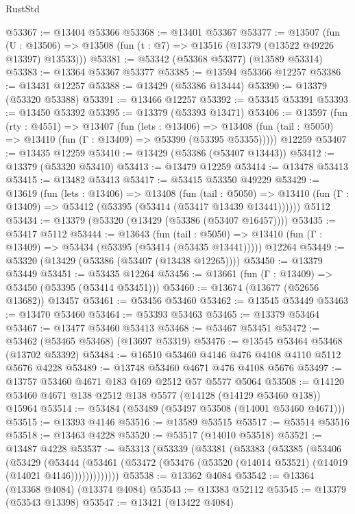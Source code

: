 \begin{lexlean}{RustStd}
\begin{coremodule}
@53367 := @13404 @53366
@53368 := @13401 @53367
@53377 := @13507
    (fun (U : @13506) => @13508 (fun (t : @7) => @13516 (@13379 (@13522 @49226 @13397) @13533)))
@53381 := @53342 (@53368 @53377) (@13589 @53314)
@53383 := @13364 @53367 @53377
@53385 := @13594 @53366 @12257
@53386 := @13431 @12257
@53388 := @13429 (@53386 @13444)
@53390 := @13379 (@53320 @53388)
@53391 := @13466 @12257
@53392 := @53345 @53391
@53393 := @13450 @53392
@53395 := @13379 (@53393 @13471)
@53406 := @13597
    (fun (rty : @4551) =>
    @13407
      (fun (lets : @13406) =>
      @13408 (fun (tail : @5050) => @13410 (fun (Γ : @13409) => @53390 (@53395 @53355)))))
    @12259
@53407 := @13435 @12259
@53410 := @13429 (@53386 (@53407 @13443))
@53412 := @13379 (@53320 @53410)
@53413 := @13479 @12259
@53414 := @13478 @53413
@53415 := @13482 @53413
@53417 := @53415 @53350 @49229
@53429 := @13619
    (fun (lets : @13406) =>
    @13408
      (fun (tail : @5050) =>
      @13410 (fun (Γ : @13409) => @53412 (@53395 (@53414 (@53417 @13439 @13441))))))
    @5112
@53434 := @13379 (@53320 (@13429 (@53386 (@53407 @16457))))
@53435 := @53417 @5112
@53444 := @13643
    (fun (tail : @5050) => @13410 (fun (Γ : @13409) => @53434 (@53395 (@53414 (@53435 @13441)))))
    @12264
@53449 := @53320 (@13429 (@53386 (@53407 (@13438 @12265))))
@53450 := @13379 @53449
@53451 := @53435 @12264
@53456 := @13661 (fun (Γ : @13409) => @53450 (@53395 (@53414 @53451)))
@53460 := @13674 (@13677 (@52656 @13682)) @13457
@53461 := @53456 @53460
@53462 := @13545 @53449
@53463 := @13470 @53460
@53464 := @53393 @53463
@53465 := @13379 @53464
@53467 := @13477 @53460 @53413
@53468 := @53467 @53451
@53472 := @53462 (@53465 @53468) (@13697 @53319)
@53476 := @13545 @53464 @53468 (@13702 @53392)
@53484 := @16510 @53460 @4146 @476 @4108 @4110 @5112 @5676 @4228
@53489 := @13748 @53460 @4671 @476 @4108 @5676
@53497 := @13757 @53460 @4671 @183 @169 @2512 @57 @5577 @5064
@53508 := @14120 @53460 @4671 @138 @2512 @138 @5577 (@14128 (@14129 @53460 @138)) @15964
@53514 := @53484 (@53489 (@53497 @53508 (@14001 @53460 @4671)))
@53515 := @13393 @4146
@53516 := @13589 @53515
@53517 := @53514 @53516
@53518 := @13463 @4228
@53520 := @53517 (@14010 @53518)
@53521 := @13487 @4228
@53537 := @53313
    (@53339
      (@53381
        (@53383
          (@53385
            (@53406
              (@53429
                (@53444
                  (@53461 (@53472 (@53476 (@53520 (@14014 @53521) (@14019 (@14021 @4146)))))))))))))
@53538 := @13362 @4084
@53542 := @13364 (@13368 @4084) (@13374 @4084)
@53543 := @13383 @52112
@53545 := @13379 (@53543 @13398)
@53547 := @13421 (@13422 @4084)

\end{coremodule}
\end{lexlean}
